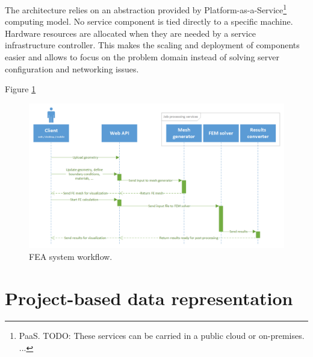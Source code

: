 The architecture relies on an abstraction provided by Platform-as-a-Service\footnote{PaaS. TODO: These services can be carried in a public cloud or on-premises. ...} computing model. No service component is tied directly to a specific machine. Hardware resources are allocated when they are needed by a service infrastructure controller. This makes the scaling and deployment of components easier and allows to focus on the problem domain instead of solving server configuration and networking issues.





Figure \ref{fig:FEA-workflow}

\begin{figure}[H]
    \centering
    \includegraphics[width=\textwidth]{figures/FEA-workflow}
    \decoRule
    \caption{FEA system workflow.}
    \label{fig:FEA-workflow}
\end{figure}

\section{Project-based data representation}

